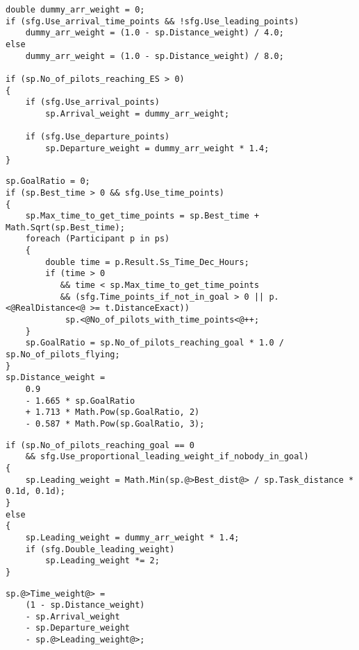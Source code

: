 \documentclass[gap.tex]{subfiles}
\begin{document}
\begin{lstlisting}[style=base, caption={Arrival weight and departure weight don't depend on distance inputs.}]
double dummy_arr_weight = 0;
if (sfg.Use_arrival_time_points && !sfg.Use_leading_points)
    dummy_arr_weight = (1.0 - sp.Distance_weight) / 4.0;
else
    dummy_arr_weight = (1.0 - sp.Distance_weight) / 8.0;

if (sp.No_of_pilots_reaching_ES > 0)
{
    if (sfg.Use_arrival_points)
        sp.Arrival_weight = dummy_arr_weight;

    if (sfg.Use_departure_points)
        sp.Departure_weight = dummy_arr_weight * 1.4;
}
\end{lstlisting}

\begin{lstlisting}[style=base, caption={Distance weight doesn't depend on distance inputs.}]
sp.GoalRatio = 0;
if (sp.Best_time > 0 && sfg.Use_time_points)
{
    sp.Max_time_to_get_time_points = sp.Best_time + Math.Sqrt(sp.Best_time);
    foreach (Participant p in ps)
    {
        double time = p.Result.Ss_Time_Dec_Hours;
        if (time > 0
           && time < sp.Max_time_to_get_time_points
           && (sfg.Time_points_if_not_in_goal > 0 || p.<@RealDistance<@ >= t.DistanceExact))
            sp.<@No_of_pilots_with_time_points<@++;
    }
    sp.GoalRatio = sp.No_of_pilots_reaching_goal * 1.0 / sp.No_of_pilots_flying;
}
sp.Distance_weight =
    0.9
    - 1.665 * sp.GoalRatio
    + 1.713 * Math.Pow(sp.GoalRatio, 2)
    - 0.587 * Math.Pow(sp.GoalRatio, 3);
\end{lstlisting}

\begin{lstlisting}[style=base, caption={Leading weight depends on \textcolor{red}{bonus} distance.}]
if (sp.No_of_pilots_reaching_goal == 0
    && sfg.Use_proportional_leading_weight_if_nobody_in_goal)
{
    sp.Leading_weight = Math.Min(sp.@>Best_dist@> / sp.Task_distance * 0.1d, 0.1d);
}
else
{
    sp.Leading_weight = dummy_arr_weight * 1.4;
    if (sfg.Double_leading_weight)
        sp.Leading_weight *= 2;
}
\end{lstlisting}

\begin{lstlisting}[style=base, caption={Time weight depends on \textcolor{red}{bonus} distance.}]
sp.@>Time_weight@> =
    (1 - sp.Distance_weight)
    - sp.Arrival_weight
    - sp.Departure_weight
    - sp.@>Leading_weight@>;
\end{lstlisting}
\end{document}
